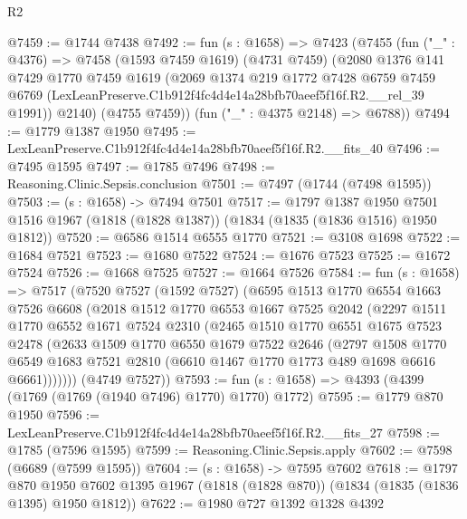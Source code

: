 \begin{lexlean}{R2}
\begin{coremodule}
@7459 := @1744 @7438
@7492 := fun (s : @1658) =>
  @7423
    (@7455
      (fun ("_" : @4376) =>
      @7458
        (@1593 @7459 @1619)
        (@4731 @7459)
        (@2080
          @1376
          @141
          @7429
          @1770
          @7459
          @1619
          (@2069
            @1374
            @219
            @1772
            @7428
            @6759
            @7459
            @6769
            (LexLeanPreserve.C1b912f4fc4d4e14a28bfb70aeef5f16f.R2.__rel_39 @1991))
          @2140)
        (@4755 @7459))
      (fun ("_" : @4375 @2148) => @6788))
@7494 := @1779 @1387 @1950
@7495 := LexLeanPreserve.C1b912f4fc4d4e14a28bfb70aeef5f16f.R2.__fits_40
@7496 := @7495 @1595
@7497 := @1785 @7496
@7498 := Reasoning.Clinic.Sepsis.conclusion
@7501 := @7497 (@1744 (@7498 @1595))
@7503 := (s : @1658) -> @7494 @7501
@7517 := @1797
    @1387
    @1950
    @7501
    @1516
    @1967
    (@1818 (@1828 @1387))
    (@1834 (@1835 (@1836 @1516) @1950 @1812))
@7520 := @6586 @1514 @6555 @1770
@7521 := @3108 @1698
@7522 := @1684 @7521
@7523 := @1680 @7522
@7524 := @1676 @7523
@7525 := @1672 @7524
@7526 := @1668 @7525
@7527 := @1664 @7526
@7584 := fun (s : @1658) =>
  @7517
    (@7520
      @7527
      (@1592 @7527)
      (@6595
        @1513
        @1770
        @6554
        @1663
        @7526
        @6608
        (@2018
          @1512
          @1770
          @6553
          @1667
          @7525
          @2042
          (@2297
            @1511
            @1770
            @6552
            @1671
            @7524
            @2310
            (@2465
              @1510
              @1770
              @6551
              @1675
              @7523
              @2478
              (@2633
                @1509
                @1770
                @6550
                @1679
                @7522
                @2646
                (@2797
                  @1508
                  @1770
                  @6549
                  @1683
                  @7521
                  @2810
                  (@6610 @1467 @1770 @1773 @489 @1698 @6616 @6661)))))))
      (@4749 @7527))
@7593 := fun (s : @1658) => @4393 (@4399 (@1769 (@1769 (@1940 @7496) @1770) @1770) @1772)
@7595 := @1779 @870 @1950
@7596 := LexLeanPreserve.C1b912f4fc4d4e14a28bfb70aeef5f16f.R2.__fits_27
@7598 := @1785 (@7596 @1595)
@7599 := Reasoning.Clinic.Sepsis.apply
@7602 := @7598 (@6689 (@7599 @1595))
@7604 := (s : @1658) -> @7595 @7602
@7618 := @1797
    @870
    @1950
    @7602
    @1395
    @1967
    (@1818 (@1828 @870))
    (@1834 (@1835 (@1836 @1395) @1950 @1812))
@7622 := @1980 @727 @1392 @1328 @4392

\end{coremodule}
\end{lexlean}

